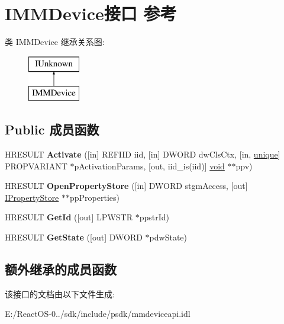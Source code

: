 \hypertarget{interface_i_m_m_device}{}\section{I\+M\+M\+Device接口 参考}
\label{interface_i_m_m_device}
类 I\+M\+M\+Device 继承关系图\+:\begin{figure}[H]
\begin{center}
\leavevmode
\includegraphics[height=2.000000cm]{interface_i_m_m_device}
\end{center}
\end{figure}
\subsection*{Public 成员函数}
\begin{DoxyCompactItemize}
\item 
\mbox{\label{interface_i_m_m_device_ad18dc1ab5dc3023cd7929bca507619d5}} 
H\+R\+E\+S\+U\+LT {\bfseries Activate} (\mbox{[}in\mbox{]} R\+E\+F\+I\+ID iid, \mbox{[}in\mbox{]} D\+W\+O\+RD dw\+Cls\+Ctx, \mbox{[}in, \hyperlink{interfaceunique}{unique}\mbox{]} P\+R\+O\+P\+V\+A\+R\+I\+A\+NT $\ast$p\+Activation\+Params, \mbox{[}out, iid\+\_\+is(iid)\mbox{]} \hyperlink{interfacevoid}{void} $\ast$$\ast$ppv)
\item 
\mbox{\label{interface_i_m_m_device_afe7fb4b958af49ff0df98d4be272e61d}} 
H\+R\+E\+S\+U\+LT {\bfseries Open\+Property\+Store} (\mbox{[}in\mbox{]} D\+W\+O\+RD stgm\+Access, \mbox{[}out\mbox{]} \hyperlink{interface_i_property_store}{I\+Property\+Store} $\ast$$\ast$pp\+Properties)
\item 
\mbox{\label{interface_i_m_m_device_a557a0ac01d16fccda37b34f45341dcbd}} 
H\+R\+E\+S\+U\+LT {\bfseries Get\+Id} (\mbox{[}out\mbox{]} L\+P\+W\+S\+TR $\ast$ppstr\+Id)
\item 
\mbox{\label{interface_i_m_m_device_aba9d7fe7fa793541696eac22ac262985}} 
H\+R\+E\+S\+U\+LT {\bfseries Get\+State} (\mbox{[}out\mbox{]} D\+W\+O\+RD $\ast$pdw\+State)
\end{DoxyCompactItemize}
\subsection*{额外继承的成员函数}


该接口的文档由以下文件生成\+:\begin{DoxyCompactItemize}
\item 
E\+:/\+React\+O\+S-\/0../sdk/include/psdk/mmdeviceapi.\+idl\end{DoxyCompactItemize}
